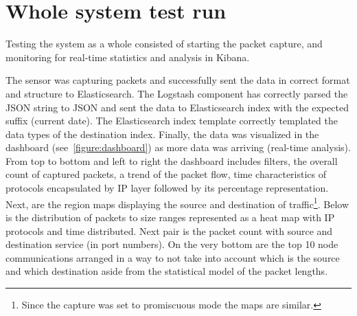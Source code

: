 \documentclass[12pt,a4paper,twoside]{book}
\begin{document}
    \section{Whole system test run} \label{tests:one}
        Testing the system as a whole consisted of starting the packet capture, and monitoring for real-time statistics and analysis in Kibana.\par
        The sensor was capturing packets and successfully sent the data in correct format and structure to Elasticsearch. The Logstash component has correctly parsed the JSON string to JSON and sent the data to Elasticsearch index with the expected suffix (current date). The Elasticsearch index template correctly templated the data types of the destination index. Finally, the data was visualized in the dashboard (see~\autoref{figure:dashboard}) as more data was arriving (real-time analysis). From top to bottom and left to right the dashboard includes filters, the overall count of captured packets, a trend of the packet flow, time characteristics of protocols encapsulated by IP layer followed by its percentage representation. Next, are the region maps displaying the source and destination of traffic\footnote{Since the capture was set to promiscuous mode the maps are similar.}. Below is the distribution of packets to size ranges represented as a heat map with IP protocols and time distributed. Next pair is the packet count with source and destination service (in port numbers). On the very bottom are the top 10 node communications arranged in a way to not take into account which is the source and which destination aside from the statistical model of the packet lengths.
\end{document}
